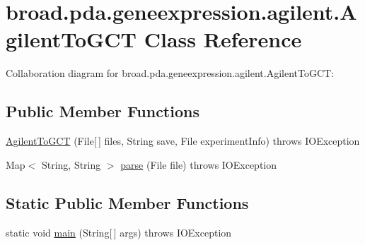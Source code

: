 \hypertarget{classbroad_1_1pda_1_1geneexpression_1_1agilent_1_1_agilent_to_g_c_t}{\section{broad.\+pda.\+geneexpression.\+agilent.\+Agilent\+To\+G\+C\+T Class Reference}
\label{classbroad_1_1pda_1_1geneexpression_1_1agilent_1_1_agilent_to_g_c_t}
}


Collaboration diagram for broad.\+pda.\+geneexpression.\+agilent.\+Agilent\+To\+G\+C\+T\+:
\subsection*{Public Member Functions}
\begin{DoxyCompactItemize}
\item 
\hyperlink{classbroad_1_1pda_1_1geneexpression_1_1agilent_1_1_agilent_to_g_c_t_ae207df08fb1975cc4c3260fb76a0df49}{Agilent\+To\+G\+C\+T} (File\mbox{[}$\,$\mbox{]} files, String save, File experiment\+Info)  throws I\+O\+Exception
\item 
Map$<$ String, String $>$ \hyperlink{classbroad_1_1pda_1_1geneexpression_1_1agilent_1_1_agilent_to_g_c_t_ad953bb48895e280001694bd3c5f866bc}{parse} (File file)  throws I\+O\+Exception
\end{DoxyCompactItemize}
\subsection*{Static Public Member Functions}
\begin{DoxyCompactItemize}
\item 
static void \hyperlink{classbroad_1_1pda_1_1geneexpression_1_1agilent_1_1_agilent_to_g_c_t_a19a14508d238f8becfcac8455933973f}{main} (String\mbox{[}$\,$\mbox{]} args)  throws I\+O\+Exception
\end{DoxyCompactItemize}


